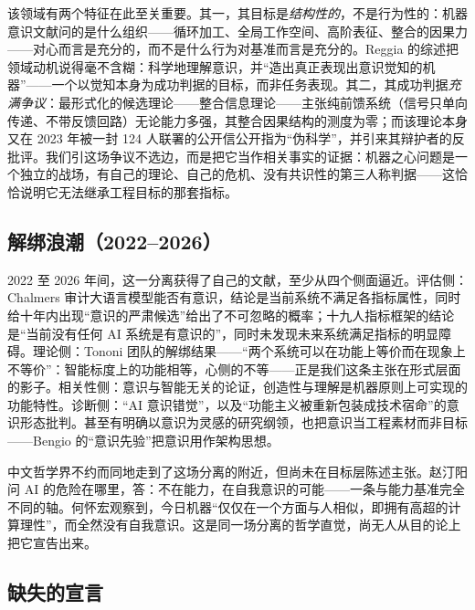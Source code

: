 \documentclass[10pt,fontset=fandol]{ctexart}
\begin{document}
该领域有两个特征在此至关重要。其一，其目标是\emph{结构性的}，不是行为性的：机器意识文献问的是什么组织——循环加工、全局工作空间、高阶表征、整合的因果力——对心而言是充分的，而不是什么行为对基准而言是充分的。Reggia 的综述把领域动机说得毫不含糊：科学地理解意识，并“造出真正表现出意识觉知的机器”\cite{reggia2013rise}——一个以觉知本身为成功判据的目标，而非任务表现。其二，其成功判据\emph{充满争议}：最形式化的候选理论——整合信息理论——主张纯前馈系统（信号只单向传递、不带反馈回路）无论能力多强，其整合因果结构的测度为零\cite{albantakis2023iit}；而该理论本身又在 2023 年被一封 124 人联署的公开信公开指为“伪科学”，并引来其辩护者的反批评。我们引这场争议不选边，而是把它当作相关事实的证据：机器之心问题是一个独立的战场，有自己的理论、自己的危机、没有共识性的第三人称判据——这恰恰说明它无法继承工程目标的那套指标。

\subsection{解绑浪潮（2022--2026）}\label{sec:genealogywave}

2022 至 2026 年间，这一分离获得了自己的文献，至少从四个侧面逼近。评估侧：Chalmers 审计大语言模型能否有意识，结论是当前系统不满足各指标属性，同时给十年内出现“意识的严肃候选”给出了不可忽略的概率\cite{chalmers2023llm}；十九人指标框架的结论是“当前没有任何 AI 系统是有意识的”，同时未发现未来系统满足指标的明显障碍\cite{butlin2023consciousness}。理论侧：Tononi 团队的解绑结果——“两个系统可以在功能上等价而在现象上不等价”\cite{findlay2024dissociating}：智能标度上的功能相等，心侧的不等——正是我们这条主张在形式层面的影子。相关性侧：意识与智能无关的论证，创造性与理解是机器原则上可实现的功能特性\cite{pesonen2026notobstacles}。诊断侧：“AI 意识错觉”\cite{elmoznino2025illusions}，以及“功能主义被重新包装成技术宿命”的意识形态批判\cite{jorge2026harsh}。甚至有明确以意识为灵感的研究纲领，也把意识当工程素材而非目标——Bengio 的“意识先验”把意识用作架构思想\cite{bengio2017consciousness}。

中文哲学界不约而同地走到了这场分离的附近，但尚未在目标层陈述主张。赵汀阳问 AI 的危险在哪里，答：不在能力，在自我意识的可能——一条与能力基准完全不同的轴\cite{zhao2019selfconsciousness}。何怀宏观察到，今日机器“仅仅在一个方面与人相似，即拥有高超的计算理性”，而全然没有自我意识\cite{he2022what}。这是同一场分离的哲学直觉，尚无人从目的论上把它宣告出来。

\subsection{缺失的宣言}\label{sec:genealogydeclaration}
\end{document}
